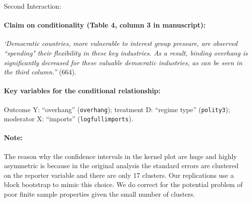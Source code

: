 \documentclass[12pt]{article}
\begin{document}
\clearpage




\noindent Second Interaction:



\paragraph{Claim on conditionality (Table 4, column 3 in manuscript):} \emph{`Democratic countries, more vulnerable to interest group pressure, are observed ``spending" their flexibility in these key industries. As a result, binding overhang is significantly decreased for these valuable democratic industries, as can be seen in the third column.''} (664). 



\paragraph{Key variables for the conditional relationship:} Outcome Y:
``overhang'' (\texttt{overhang}); treatment D: ``regime type'' (\texttt{polity3}); moderator X: ``imports''
(\texttt{logfullimports}).

\paragraph{Note:} The reason why the confidence intervals in the
kernel plot are huge and highly asymmetric is because in the original analysis the standard errors are clustered on the reporter variable and there are
only 17 clusters. Our replications use a block bootstrap to mimic this
choice. We do correct for the potential problem of poor finite sample
properties given the small number of clusters.


\newpage
\end{document}
